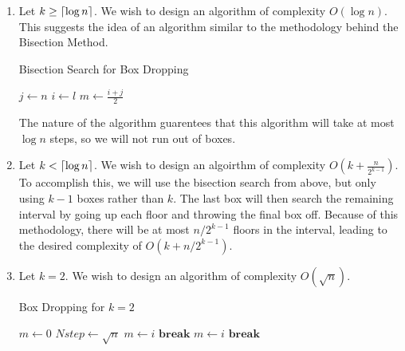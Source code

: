 \documentclass{article}
\DeclarePairedDelimiter{\ceil}{\lceil}{\rceil} %
\begin{document}
\begin{enumerate}

\item Let $k \geq \ceil{\log{n}}$. 
We wish to design an algorithm of complexity $O(\log{n})$.
This suggests the idea of an algorithm similar to the methodology behind the Bisection Method.
\begin{algorithm}[H]
\caption{Bisection Search for Box Dropping}
\begin{algorithmic}[1]
\State $j \gets n$ 
\State $i \gets l$ 
\State $m \gets \frac{i + j}{2}$
 
\State {}
\Else
\State {}
\EndIf
{}
\EndProcedure
\end{algorithmic}
\end{algorithm}
The nature of the algorithm guarentees that this algorithm will take at most $\log{n}$ steps, so we will not run out of boxes.

\item Let $k < \ceil{\log{n}}$.
We wish to design an algoirthm of complexity $O(k + \frac{n}{2^{k-1}})$.
To accomplish this, we will use the bisection search from above, but only using $k-1$ boxes rather than $k$.
The last box will then search the remaining interval by going up each floor and throwing the final box off. 
Because of this methodology, there will be at most $n/2^{k-1}$ floors in the interval, leading to the desired complexity of $O(k + n/2^{k-1})$.

\item Let $k = 2$. 
We wish to design an algorithm of complexity $O(\sqrt{n})$. 
\begin{algorithm}[H]
\caption{Box Dropping for $k = 2$}
\begin{algorithmic}[1]
\State $m \gets 0$ 
\State $Nstep \gets \sqrt{n}$ 
\State {}
\State $m \gets i$
\State $\textbf{break}$
\EndIf
\EndFor
{}
\State {}
\State $m \gets i$
\State $\textbf{break}$
\EndIf
\EndFor
{}
\EndProcedure
\end{algorithmic}
\end{algorithm}

\end{enumerate}
\end{document}
